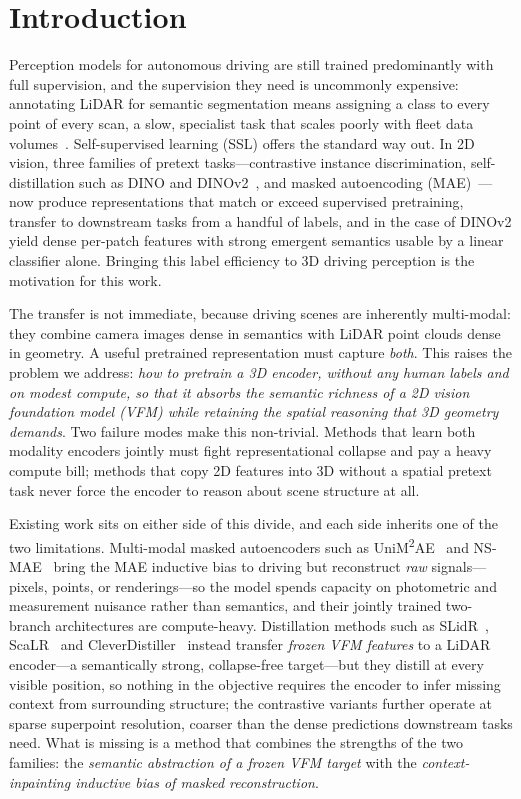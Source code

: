 \section{Introduction}



Perception models for autonomous driving are still trained
predominantly with full supervision, and the supervision they need is
uncommonly expensive: annotating LiDAR for semantic segmentation means
assigning a class to every point of every scan, a slow, specialist task
that scales poorly with fleet data volumes~\cite{semantickitti}.
Self-supervised learning (SSL) offers the standard way out. In 2D
vision, three families of pretext tasks---contrastive instance
discrimination, self-distillation such as DINO and
DINOv2~\cite{dino,dinov2}, and masked autoencoding (MAE)~\cite{mae}---now
produce representations that match or exceed supervised pretraining,
transfer to downstream tasks from a handful of labels, and in the case
of DINOv2 yield dense per-patch features with strong emergent semantics
usable by a linear classifier alone. Bringing this label efficiency to
3D driving perception is the motivation for this work.

The transfer is not immediate, because driving scenes are inherently
multi-modal: they combine camera images dense in semantics with LiDAR
point clouds dense in geometry. A useful pretrained representation must
capture \emph{both}. This raises the problem we address: \emph{how to
pretrain a 3D encoder, without any human labels and on modest compute,
so that it absorbs the semantic richness of a 2D vision foundation
model (VFM) while retaining the spatial reasoning that 3D geometry
demands}. Two failure modes make this non-trivial. Methods that learn
both modality encoders jointly must fight representational collapse and
pay a heavy compute bill; methods that copy 2D features into 3D without
a spatial pretext task never force the encoder to reason about scene
structure at all.

Existing work sits on either side of this divide, and each side
inherits one of the two limitations. Multi-modal masked autoencoders
such as UniM\textsuperscript{2}AE~\cite{unim2ae} and
NS-MAE~\cite{nsmae} bring the MAE inductive bias to driving but
reconstruct \emph{raw} signals---pixels, points, or renderings---so the
model spends capacity on photometric and measurement nuisance rather
than semantics, and their jointly trained two-branch architectures are
compute-heavy. Distillation methods such as SLidR~\cite{slidr},
ScaLR~\cite{scalr} and CleverDistiller~\cite{cleverdistiller} instead
transfer \emph{frozen VFM features} to a LiDAR encoder---a
semantically strong, collapse-free target---but they distill at every
visible position, so nothing in the objective requires the encoder to
infer missing context from surrounding structure; the contrastive
variants further operate at sparse superpoint resolution, coarser than
the dense predictions downstream tasks need. What is missing is a
method that combines the strengths of the two families: the
\emph{semantic abstraction of a frozen VFM target} with the
\emph{context-inpainting inductive bias of masked reconstruction}.

